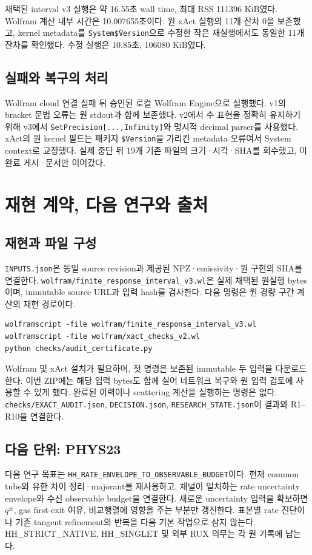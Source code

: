 \documentclass[11pt,a4paper]{article}
\numberwithin{equation}{section}
\begin{document}
채택된 interval v3 실행은 약 16.55초 wall time, 최대 RSS 111396 KiB였다. Wolfram 계산 내부 시간은 10.007655초이다. 원 xAct 실행의 11개 잔차 0을 보존했고, kernel metadata를 \texttt{System\`\$Version}으로 수정한 작은 재실행에서도 동일한 11개 잔차를 확인했다. 수정 실행은 10.85초, 106080 KiB였다.

\subsection*{실패와 복구의 처리}
Wolfram cloud 연결 실패 뒤 승인된 로컬 Wolfram Engine으로 실행했다. v1의 bracket 문법 오류는 원 stdout과 함께 보존했다. v2에서 수 표현을 정확히 유지하기 위해 v3에서 \texttt{SetPrecision[...,Infinity]}와 명시적 decimal parser를 사용했다. xAct의 원 kernel 필드는 패키지 \texttt{\$Version}을 가리킨 metadata 오류여서 System context로 교정했다. 실제 중단 뒤 19개 기존 파일의 크기·시각·SHA를 회수했고, 미완료 게시·문서만 이어갔다.

\newpage
\section{재현 계약, 다음 연구와 출처}
\subsection*{재현과 파일 구성}
\texttt{INPUTS.json}은 동일 source revision과 제공된 NPZ·emissivity·원 구현의 SHA를 연결한다. \texttt{wolfram/finite\_response\_interval\_v3.wl}은 실제 채택된 원실행 bytes이며, immutable source URL과 입력 hash를 검사한다. 다음 명령은 원 경량 구간 계산의 재현 경로이다.
\begin{verbatim}
wolframscript -file wolfram/finite_response_interval_v3.wl
wolframscript -file wolfram/xact_checks_v2.wl
python checks/audit_certificate.py
\end{verbatim}
Wolfram 및 xAct 설치가 필요하며, 첫 명령은 보존된 immutable 두 입력을 다운로드한다. 이번 ZIP에는 해당 입력 bytes도 함께 실어 네트워크 복구와 원 입력 검토에 사용할 수 있게 했다. 완료된 이력이나 scattering 계산을 실행하는 명령은 없다. \texttt{checks/EXACT\_AUDIT.json}, \texttt{DECISION.json}, \texttt{RESEARCH\_STATE.json}이 결과와 R1--R10을 연결한다.

\subsection*{다음 단위: PHYS23}
다음 연구 목표는 \texttt{HH\_RATE\_ENVELOPE\_TO\_OBSERVABLE\_BUDGET}이다. 현재 common tube와 유한 차이 정리·majorant를 재사용하고, 채널이 일치하는 rate uncertainty envelope와 수신 observable budget을 연결한다. 새로운 uncertainty 입력을 확보하면 $q^\pm$, gas first-exit 여유, 비교행렬에 영향을 주는 부분만 갱신한다. 표본별 rate 진단이나 기존 tangent refinement의 반복을 다음 기본 작업으로 삼지 않는다. HH\_STRICT\_NATIVE, HH\_SINGLET 및 외부 RUX 의무는 각 원 기록에 남는다.
\end{document}
